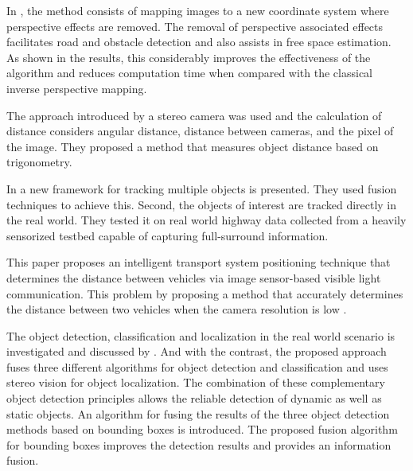 In \cite{Oliveira2015}, the method consists of mapping images to a new coordinate system where perspective effects are removed. The removal of perspective associated effects facilitates road and obstacle detection and also assists in free space estimation. As shown in the results, this considerably improves the effectiveness of the algorithm and reduces computation time when compared with the classical inverse perspective mapping.

The approach introduced by \cite{Salman2017} a stereo camera was used and the calculation of distance considers angular distance, distance between cameras, and the pixel of the image. They proposed a method that measures object distance based on trigonometry.   

 In \cite{Rangesh2019} a new framework for tracking multiple objects  is presented. They used fusion techniques to achieve this. Second, the objects of interest are tracked directly in the real world. They tested it on real world highway data collected from a heavily sensorized testbed capable of capturing full-surround information.



This paper proposes an intelligent transport system positioning technique that determines the distance between vehicles via image sensor-based visible light communication. This problem by proposing a method that accurately determines the distance between two vehicles when the camera resolution is low \cite{Tram2018}.


The object detection, classification and localization in the real world scenario is investigated and discussed by \cite{Hofmann2019}. And with the contrast, the proposed approach fuses three different algorithms for object detection and classification and uses stereo vision for object localization. The combination of these complementary object detection principles allows the reliable detection of dynamic as well as static objects. An algorithm for fusing the results of the three object detection methods based on bounding boxes is introduced. The proposed fusion algorithm for bounding boxes improves the detection results and provides an information fusion.

